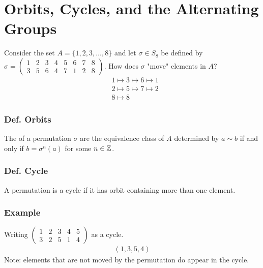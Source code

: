 \section{Orbits, Cycles, and the Alternating Groups}

Consider the set $A = \{1,2,3,\ldots,8\}$ and let $\sigma \in S_8$ be defined by $\sigma = \begin{pmatrix}
    1 & 2 & 3 & 4 & 5 & 6 & 7 & 8 \\
    3 & 5 & 6 & 4 & 7 & 1 & 2 & 8
\end{pmatrix}$. How does $\sigma$ "move" elements in $A$?
\begin{align*}
    & 1 \mapsto 3 \mapsto 6 \mapsto 1 \\
    & 2 \mapsto 5 \mapsto 7 \mapsto 2 \\
    & 8 \mapsto 8
\end{align*}

\subsubsection{Def. Orbits}
The  of a permutation $\sigma$ are the equivalence class of $A$ determined by $a\sim b$ if and only if $b = \sigma^n(a)$ for some $n \in \mathbb{Z}$.

\subsubsection{Def. Cycle}
A permutation is a cycle if it has   orbit containing more than one element.

\subsubsection*{Example}
Writing $\begin{pmatrix}
    1 & 2 & 3 & 4 & 5 \\
    3 & 2 & 5 & 1 & 4
\end{pmatrix}$ as a cycle.
\begin{align*}
    (1,3,5,4)
\end{align*}
Note: elements that are not moved by the permutation do  appear in the cycle.

